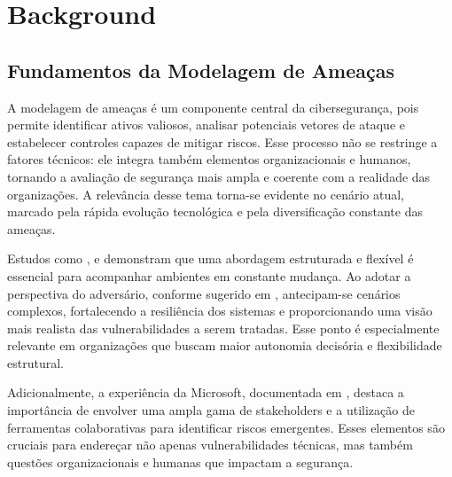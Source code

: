 
%

\chapter{Background}
\label{cha:background}

\glsresetall

\section{Fundamentos da Modelagem de Ameaças}
\label{sec:fundamentos_da_modelagem_de_ameacas}

A modelagem de ameaças é um componente central da
cibersegurança, pois permite identificar ativos valiosos,
analisar potenciais vetores de ataque e estabelecer
controles capazes de mitigar riscos. Esse processo não se
restringe a fatores técnicos: ele integra também elementos
organizacionais e humanos, tornando a avaliação de segurança
mais ampla e coerente com a realidade das organizações. A
relevância desse tema torna-se evidente no cenário atual,
marcado pela rápida evolução tecnológica e pela
diversificação constante das ameaças.

Estudos como
\cite{ThreatModelingAsABasisForSecurityRequirements},
\cite{AdvancedThreatModeling} e
\cite{DemystifyingTheThreatModelingProcess} demonstram que
uma abordagem estruturada e flexível é essencial para
acompanhar ambientes em constante mudança. Ao adotar a
perspectiva do adversário, conforme sugerido em
\cite{AHybridThreatModelingMethod}, antecipam-se cenários
complexos, fortalecendo a resiliência dos sistemas e
proporcionando uma visão mais realista das vulnerabilidades
a serem tratadas. Esse ponto é especialmente relevante em
organizações que buscam maior autonomia decisória e
flexibilidade estrutural.

Adicionalmente, a experiência da Microsoft, documentada em
\cite{ExperiencesThreatModelingAtMicrosoft}, destaca a
importância de envolver uma ampla gama de stakeholders e a
utilização de ferramentas colaborativas para identificar
riscos emergentes. Esses elementos são cruciais para
endereçar não apenas vulnerabilidades técnicas, mas também
questões organizacionais e humanas que impactam a segurança.

